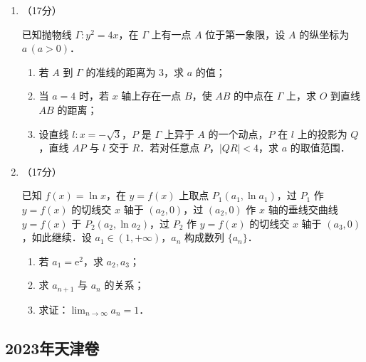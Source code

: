 \begin{description}
\begin{enumerate}[leftmargin=5pt]
        \item （17分）

        已知抛物线 $\Gamma:y^2=4x$，在 $\Gamma$ 上有一点 $A$ 位于第一象限，设 $A$ 的纵坐标为 $a\,(a>0)$．

        \begin{enumerate}[label=(\arabic*)]
            \item 若 $A$ 到 $\Gamma$ 的准线的距离为 $3$，求 $a$ 的值；
            \item 当 $a=4$ 时，若 $x$ 轴上存在一点 $B$，使 $AB$ 的中点在 $\Gamma$ 上，求 $O$ 到直线 $AB$ 的距离；
            \item 设直线 $l:x=-\sqrt{3}$，$P$ 是 $\Gamma$ 上异于 $A$ 的一个动点，$P$ 在 $l$ 上的投影为 $Q$，直线 $AP$ 与 $l$ 交于 $R$．若对任意点 $P$，$|QR|<4$，求 $a$ 的取值范围．
        \end{enumerate}

        \item （17分）

        已知 $f(x)=\ln x$，在 $y=f(x)$ 上取点 $P_1(a_1,\ln a_1)$，过 $P_1$ 作 $y=f(x)$ 的切线交 $x$ 轴于 $(a_2,0)$，过 $(a_2,0)$ 作 $x$ 轴的垂线交曲线 $y=f(x)$ 于 $P_2(a_2,\ln a_2)$，过 $P_2$ 作 $y=f(x)$ 的切线交 $x$ 轴于 $(a_3,0)$，如此继续．设 $a_1\in(1,+\infty)$，$a_n$ 构成数列 $\{a_n\}$．

        \begin{enumerate}[label=(\arabic*)]
            \item 若 $a_1=\mathrm{e}^2$，求 $a_2,a_3$；
            \item 求 $a_{n+1}$ 与 $a_n$ 的关系；
            \item 求证：$\displaystyle\lim_{n\to\infty}a_n=1$．
        \end{enumerate}
    \end{enumerate}
\end{description}
\clearpage


\subsection{2023年天津卷}\label{gk:2023年天津卷}


